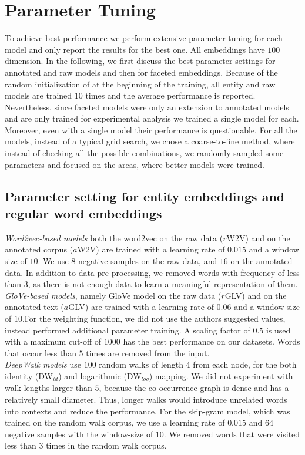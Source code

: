 \section{Parameter Tuning } \label{sec:setup}
 To achieve best performance we perform extensive parameter tuning for each model and only report the results for the best one. All embeddings have $100$ dimension. In the following, we first discuss the best parameter settings for annotated and raw models and then for faceted embeddings. Because of the random initialization of at the beginning of the training, all entity and raw models are trained $10$ times and the average performance is reported. Nevertheless, since faceted models were only an extension to annotated models and are only trained for experimental analysis we trained a single model for each. Moreover, even with a single model their performance is questionable. For all the models, instead of a typical grid search, we chose a coarse-to-fine method, where instead of checking all the possible combinations, we randomly sampled some parameters and focused on the areas, where better models were trained.
 
\subsection{Parameter setting for  entity embeddings and regular word embeddings  }
 
\emph{Word2vec-based models} both the word2vec on the raw data ($r$W2V) and on the annotated corpus ($a$W2V) are trained with a learning rate of $0.015$ and a window size of $10$. We use $8$ negative samples on the raw data, and $16$ on the annotated data. In addition to data pre-processing, we removed words with frequency of less than $3$, as there is not enough data to learn a meaningful representation of them. \\

\noindent
\emph{GloVe-based models}, namely GloVe model on the raw data ($r$GLV) and on the annotated text ($a$GLV) are trained with a learning rate of $0.06$ and a window size of $10$.For the weighting function, we did not use the authors suggested values, instead performed additional parameter training. A scaling factor of $0.5$ is used with a maximum cut-off of $1000$ has the best performance on our datasets. Words that occur less than $5$ times are removed from the input.\\

\noindent
\emph{DeepWalk models} use $100$ random walks of length $4$ from each node, for the both identity (DW$_{id}$) and logarithmic (DW$_{log}$) mapping. We did not experiment with walk lengths larger than $5$, because the co-occurrence graph is dense and has a relatively small diameter.  Thus, longer walks would introduce unrelated words into contexts and reduce the performance. For the skip-gram model, which was trained on the random walk corpus, we use a learning rate of $0.015$ and $64$ negative samples with the window-size of $10$. We removed words that were visited less than $3$ times in the random walk corpus. \\

